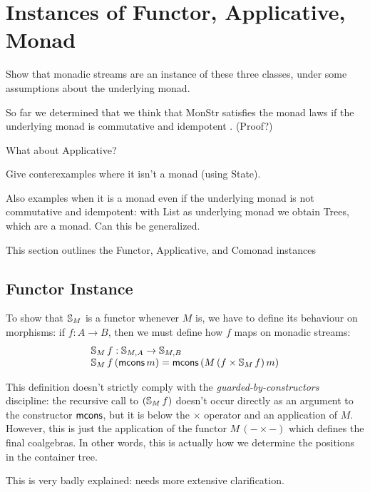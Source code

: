 \documentclass{article}
\begin{document}
\section{Instances of Functor, Applicative, Monad}

Show that monadic streams are an instance of these three classes, under some assumptions about the underlying monad.

So far we determined that we think that MonStr satisfies the monad laws if the underlying monad is commutative and idempotent \cite{idempotent_monads}. (Proof?)

What about Applicative?

Give conterexamples where it isn't a monad (using State).

Also examples when it is a monad even if the underlying monad is not commutative and idempotent: with List as underlying monad we obtain Trees, which are a monad. Can this be generalized.

This section outlines the Functor, Applicative, and Comonad instances

\subsection{Functor Instance}

To show that $\mathbb{S}_{M}$ is a functor whenever $M$ is, we have to define its behaviour on morphisms: if $f:A\rightarrow B$, then we must define how $f$ maps on monadic streams:
$$
\begin{array}{l}
\mathbb{S}_{M}\,f : \mathbb{S}_{M,A} \rightarrow \mathbb{S}_{M,B}\\
\mathbb{S}_{M}\,f\,(\mathsf{mcons}\,m) = \mathsf{mcons}\,(M\,(f\times \mathbb{S}_{M}\,f)\,m)
\end{array}
$$

This definition doesn't strictly comply with the {\em guarded-by-constructors} discipline: the recursive call to $(\mathbb{S}_{M}\,f)$ doesn't occur directly as an argument to the constructor $\mathsf{mcons}$, but it is below the $\times$ operator and an application of $M$.
However, this is just the application of the functor $M\,(- \times -)$ which defines the final coalgebras. In other words, this is actually how we determine the positions in the container tree.
\begin{vcomment}
	This is very badly explained: needs more extensive clarification.
\end{vcomment}
\end{document}
